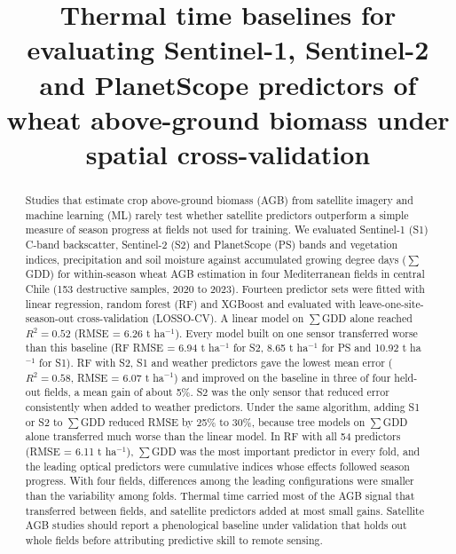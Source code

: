 \documentclass[
  british,
]{interact}
\author{}
\date{}
\begin{document}

\title{Thermal time baselines for evaluating Sentinel-1, Sentinel-2 and PlanetScope predictors of wheat above-ground biomass under spatial cross-validation}

\author{
}

\maketitle

\begin{abstract}
Studies that estimate crop above-ground biomass (AGB) from satellite imagery and machine learning (ML) rarely test whether satellite predictors outperform a simple measure of season progress at fields not used for training. We evaluated Sentinel-1 (S1) C-band backscatter, Sentinel-2 (S2) and PlanetScope (PS) bands and vegetation indices, precipitation and soil moisture against accumulated growing degree days ($\sum$GDD) for within-season wheat AGB estimation in four Mediterranean fields in central Chile (153 destructive samples, 2020 to 2023). Fourteen predictor sets were fitted with linear regression, random forest (RF) and XGBoost and evaluated with leave-one-site-season-out cross-validation (LOSSO-CV). A linear model on $\sum$GDD alone reached $R^2 = 0.52$ (RMSE = 6.26 t ha$^{-1}$). Every model built on one sensor transferred worse than this baseline (RF RMSE = 6.94 t ha$^{-1}$ for S2, 8.65 t ha$^{-1}$ for PS and 10.92 t ha$^{-1}$ for S1). RF with S2, S1 and weather predictors gave the lowest mean error ($R^2 = 0.58$, RMSE = 6.07 t ha$^{-1}$) and improved on the baseline in three of four held-out fields, a mean gain of about 5\%. S2 was the only sensor that reduced error consistently when added to weather predictors. Under the same algorithm, adding S1 or S2 to $\sum$GDD reduced RMSE by 25\% to 30\%, because tree models on $\sum$GDD alone transferred much worse than the linear model. In RF with all 54 predictors (RMSE = 6.11 t ha$^{-1}$), $\sum$GDD was the most important predictor in every fold, and the leading optical predictors were cumulative indices whose effects followed season progress. With four fields, differences among the leading configurations were smaller than the variability among folds. Thermal time carried most of the AGB signal that transferred between fields, and satellite predictors added at most small gains. Satellite AGB studies should report a phenological baseline under validation that holds out whole fields before attributing predictive skill to remote sensing.
\end{abstract}
\end{document}
